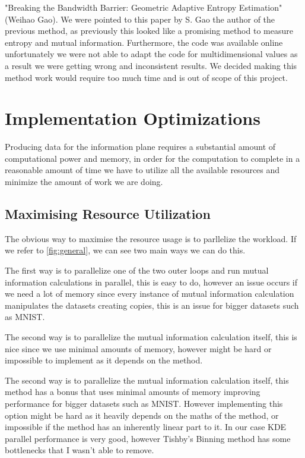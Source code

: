 \documentclass[dissertation.tex]{subfiles}
\begin{document}
  "Breaking the Bandwidth Barrier: Geometric Adaptive Entropy Estimation"
  (Weihao Gao). We were pointed to this paper by S. Gao the author of the
  previous method, as previously this looked like a promising method to measure
  entropy and mutual information. Furthermore, the code was available online
  unfortunately we were not able to adapt the code for multidimensional values
  as a result we were getting wrong and inconsistent results. We decided making
  this method work would require too much time and is out of scope of this
  project.

\section{Implementation Optimizations}

Producing data for the information plane requires a substantial amount of
computational power and memory, in order for the computation to complete in a
reasonable amount of time we have to utilize all the available resources and
minimize the amount of work we are doing.

\subsection{Maximising Resource Utilization}

The obvious way to maximise the resource usage is to parllelize the workload.
If we refer to \autoref{fig:general}, we can see two main ways we can do this.

The first way is to parallelize one of the two outer loops and run mutual
information calculations in parallel, this is easy to do, however an issue
occurs if we need a lot of memory since every instance of mutual information
calculation manipulates the datasets creating copies, this is an issue for
bigger datasets such as MNIST.

The second way is to parallelize the mutual information calculation itself, this
is nice since we use minimal amounts of memory, however might be hard or
impossible to implement as it depends on the method.

The second way is to parallelize the mutual information calculation itself, this
method has a  bonus that uses minimal amounts of memory improving performance
for bigger datasets such as MNIST. However implementing this option might be
hard as it heavily depends on the maths of the method, or impossible if the
method has an inherently linear part to it. In our case KDE parallel performance
is very good, however Tishby's Binning method has some bottlenecks that I
wasn't able to remove.
\end{document}
